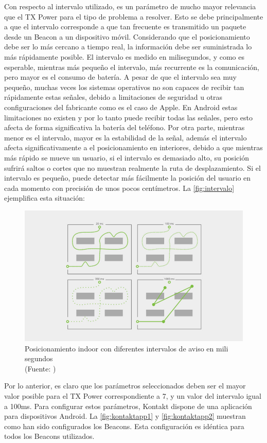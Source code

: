 Con respecto al intervalo utilizado, es un parámetro de mucho mayor relevancia que el TX Power para el tipo de problema a resolver. Esto se debe principalmente a que el intervalo corresponde a que tan frecuente es transmitido un paquete desde un Beacon a un dispositivo móvil. Considerando que el posicionamiento debe ser lo más cercano a tiempo real, la información debe ser suministrada lo más rápidamente posible. El intervalo es medido en milisegundos, y como es esperable, mientras más pequeño el intervalo, más recurrente es la comunicación, pero mayor es el consumo de batería. A pesar de que el intervalo sea muy pequeño, muchas veces los sistemas operativos no son capaces de recibir tan rápidamente estas señales, debido a limitaciones de seguridad u otras configuraciones del fabricante como es el caso de Apple. En Android estas limitaciones no existen y por lo tanto puede recibir todas las señales, pero esto afecta de forma significativa la batería del teléfono. Por otra parte, mientras menor es el intervalo, mayor es la estabilidad de la señal, además el intervalo afecta significativamente a el posicionamiento en interiores, debido a que mientras más rápido se mueve un usuario, si el intervalo es demasiado alto, su posición sufrirá saltos o cortes que no muestran realmente la ruta de desplazamiento. Si el intervalo es pequeño, puede detectar más fácilmente la posición del usuario en cada momento con precisión de unos pocos centímetros. La \autoref{fig:intervalo} ejemplifica esta situación:

\begin{figure}[ht!]
\centering
\includegraphics[width=.6\textwidth]{figures/interval.jpg}
\caption[Posicionamiento con diferentes intervalos de aviso]{Posicionamiento indoor con diferentes intervalos de aviso en mili segundos\\
{\scriptsize (Fuente: \cite{interval})}}
\label{fig:intervalo}
\end{figure}

Por lo anterior, es claro que los parámetros seleccionados deben ser el mayor valor posible para el TX Power correspondiente a 7, y un valor del intervalo igual a 100ms. Para configurar estos parámetros, Kontakt dispone de una aplicación para dispositivos Android. La \autoref{fig:kontaktapp1} y \ref{fig:kontaktapp2} muestran como han sido configurados los Beacons. Esta configuración es idéntica para todos los Beacons utilizados.


